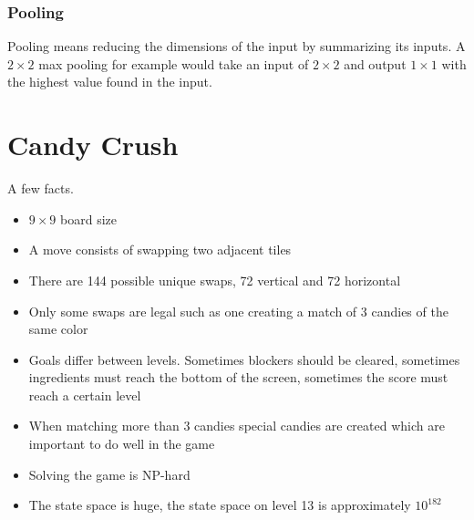 \documentclass{kththesis}
\begin{document}
\subsubsection{Pooling}
Pooling means reducing the dimensions of the input by summarizing its inputs. A $2\times2$ max pooling for example would take an input of $2\times2$ and output $1\times1$ with the highest value found in the input.

\section{Candy Crush}
A few facts.
\begin{itemize}
\item $9\times9$ board size
\item A move consists of swapping two  adjacent tiles 
\item There are 144 possible unique swaps, 72 vertical and 72 horizontal
\item  Only some  swaps are legal such as one creating a match of 3 candies of the same color
\item Goals differ between levels. Sometimes blockers should be cleared, sometimes ingredients must reach the bottom of the screen, sometimes the score must reach a certain level
\item When matching more than 3 candies special candies are created  which are important to do well in the game
\item Solving the game is NP-hard \cite{DBLP:journals/corr/Walsh14}
\item The state space is  huge, the state space on level 13 is approximately $10^{182}$ \cite{poromaa2016}
\end{itemize}
\end{document}
